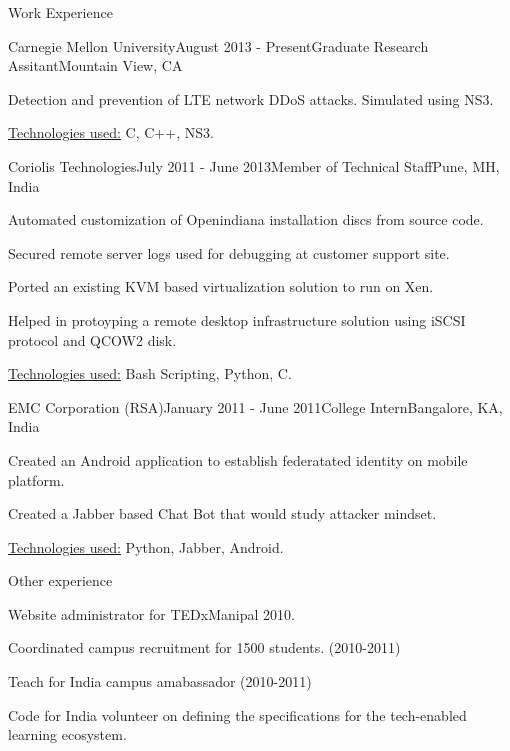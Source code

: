 \documentclass{resume} %
\begin{document}
\begin{rSection}{Work Experience}

\begin{rSubsection}{Carnegie Mellon University}{August 2013 - Present}{Graduate Research Assitant}{Mountain View, CA}
\item Detection and prevention of LTE network DDoS attacks. Simulated using NS3.
\item{\underline{Technologies used:} C, C++, NS3.}
\end{rSubsection}


\begin{rSubsection}{Coriolis Technologies}{July 2011 - June 2013}{Member of Technical Staff}{Pune, MH, India}
\item Automated customization of Openindiana installation discs from source code.
\item Secured remote server logs used for debugging at customer support site.
\item Ported an existing KVM based virtualization solution to run on Xen.
\item Helped in protoyping a remote desktop infrastructure solution using iSCSI protocol and QCOW2 disk.
\item{\underline{Technologies used:} Bash Scripting, Python, C.	}
\end{rSubsection}


\begin{rSubsection}{EMC Corporation (RSA)}{January 2011 - June 2011}{College Intern}{Bangalore, KA, India}
\item Created an Android application to establish federatated identity on mobile platform.
\item Created a Jabber based Chat Bot that would study attacker mindset.
\item{\underline{Technologies used:} Python, Jabber, Android.}
\end{rSubsection}

\end{rSection}



\begin{rSection}{Other experience}

\item{Website administrator for TEDxManipal 2010.}
\item{Coordinated campus recruitment for 1500 students. (2010-2011)}
\item{Teach for India campus amabassador (2010-2011)}
\item{Code for India volunteer on defining the specifications for the tech-enabled learning ecosystem. }

\end{rSection}
\end{document}
